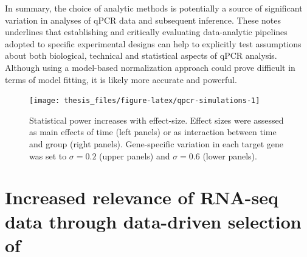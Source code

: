 \documentclass[twoside,10pt]{gihclass} %
\begin{document}
In summary, the choice of analytic methods is potentially a source of significant variation in analyses of qPCR data and subsequent inference.
These notes underlines that establishing and critically evaluating data-analytic pipelines adopted to specific experimental designs can help to explicitly test assumptions about both biological, technical and statistical aspects of qPCR analysis.
Although using a model-based normalization approach could prove difficult in terms of model fitting, it is likely more accurate and powerful.
\begin{figure}

{\centering \texttt{[image: thesis\_files/figure-latex/qpcr-simulations-1]} 

}

\caption[qPCR power-simulation]{Statistical power increases with effect-size. Effect sizes were assessed as main effects of time (left panels) or as interaction between time and group (right panels). Gene-specific variation in each target gene was set to $\sigma=0.2$ (upper panels) and $\sigma=0.6$ (lower panels).}\label{fig:qpcr-simulations}
\end{figure}
\hypertarget{increased-relevance-of-rna-seq-data-through-data-driven-selection-of}{%
\section{Increased relevance of RNA-seq data through data-driven selection of}\label{increased-relevance-of-rna-seq-data-through-data-driven-selection-of}}
\end{document}
